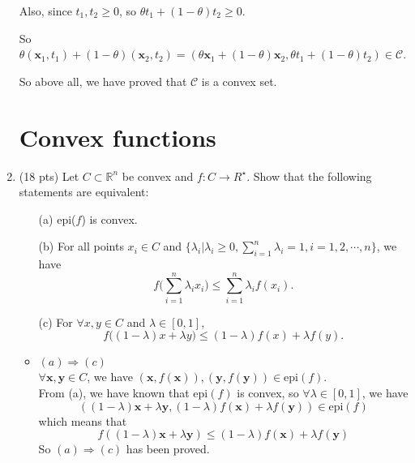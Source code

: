 \documentclass[10pt]{article}
\renewcommand{\mathbf}{\boldsymbol}
\begin{document}
\begin{enumerate}
Also, since $t_1,t_2\geq 0$, so $\theta t_1+(1-\theta)t_2\geq 0$.

So $\theta(\mathbf{x}_1,t_1)+(1-\theta)(\mathbf{x}_2,t_2)=(\theta \mathbf{x}_1+(1-\theta)\mathbf{x}_2,\theta t_1+(1-\theta)t_2)\in \mathcal{C}$.

So above all, we have proved that $\mathcal{C}$ is a convex set.\\


\newpage

\section{Convex functions}
\item {\color{red} (18 pts)} Let $C\subset \mathbb{R}^n$ be convex and $f:C\rightarrow R^\star$. Show that the following statements are equivalent:
\begin{itemize}
    \item[(a)] epi($f$) is convex.
    \item[(b)] For all points $x_i\in C$ and $\{\lambda_i|\lambda_i\geq0, \sum_{i=1}^n \lambda_i=1, i=1,2,\cdots,n\}$, we have
    \begin{equation*}
        f\Big(\sum\limits_{i=1}^n \lambda_ix_i\Big)\leq \sum\limits_{i=1}^n \lambda_if(x_i).
    \end{equation*}
    \item[(c)] For $\forall x,y\in C$ and $\lambda\in[0,1]$,
    \begin{equation*}
        f\Big((1-\lambda)x+\lambda y\Big)\leq(1-\lambda)f(x)+\lambda f(y).
    \end{equation*}
\end{itemize}

\begin{itemize}
    \item $ (a) \Rightarrow (c)$\\
    $\forall \mathbf{x},\mathbf{y}\in C$, we have $(\mathbf{x},f(\mathbf{x})),(\mathbf{y},f(\mathbf{y}))\in \text{epi}(f)$.\\
    From (a), we have known that epi$(f)$ is convex, so $\forall\lambda\in [0,1]$, we have 
    $$((1-\lambda)\mathbf{x}+\lambda \mathbf{y}, (1-\lambda)f(\mathbf{x})+\lambda f(\mathbf{y}))\in\text{epi}(f)$$
    which means that
    $$f((1-\lambda)\mathbf{x}+\lambda \mathbf{y})\leq (1-\lambda)f(\mathbf{x})+\lambda f(\mathbf{y})$$
    So $ (a) \Rightarrow (c)$ has been proved.\\
    

\end{itemize}
\end{enumerate}
\end{document}
